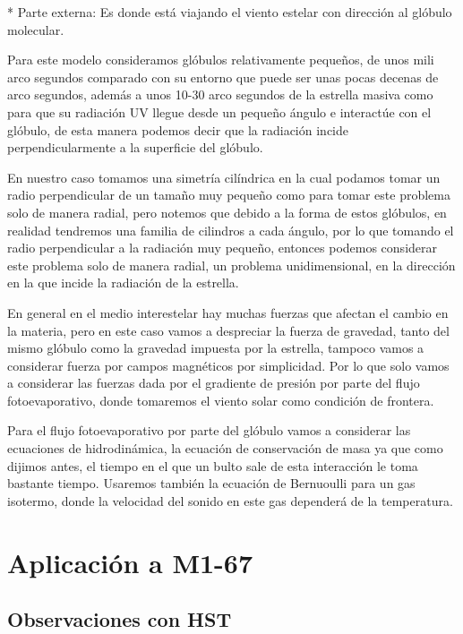 \documentclass{book}
\begin{document}
* Parte externa: Es donde está viajando el viento estelar con dirección al glóbulo molecular.

Para este modelo consideramos glóbulos relativamente pequeños, de unos mili arco segundos comparado con su entorno que puede ser unas pocas decenas de arco segundos, además a unos 10-30 arco segundos de la estrella masiva como para que su radiación UV llegue desde un pequeño ángulo e interactúe con el glóbulo, de esta manera podemos decir que la radiación incide perpendicularmente a la superficie del glóbulo.

En nuestro caso tomamos una simetría cilíndrica en la cual podamos tomar un radio perpendicular de un tamaño muy pequeño como para tomar este problema solo de manera radial, pero notemos que debido a la forma de estos glóbulos, en realidad tendremos una familia de cilindros a cada ángulo, por lo que tomando el radio perpendicular a la radiación muy pequeño, entonces podemos considerar este problema solo de manera radial, un problema unidimensional, en la dirección en la que incide la radiación de la estrella.

En general en el medio interestelar hay muchas fuerzas que afectan el cambio en la materia, pero en este caso vamos a despreciar la fuerza de gravedad, tanto del mismo glóbulo como la gravedad impuesta por la estrella, tampoco vamos a considerar fuerza por campos magnéticos por simplicidad. Por lo que solo vamos a considerar las fuerzas dada por el gradiente de presión por parte del flujo fotoevaporativo, donde tomaremos el viento solar como condición de frontera.

Para el flujo fotoevaporativo por parte del glóbulo vamos a considerar las ecuaciones de hidrodinámica, la ecuación de conservación de masa ya que como dijimos antes, el tiempo en el que un bulto sale de esta interacción le toma bastante tiempo. Usaremos también la ecuación de Bernuoulli para un gas isotermo, donde la velocidad del sonido en este gas dependerá de la temperatura.





\chapter{Aplicación a M1-67}

\section{Observaciones con HST}
\end{document}
